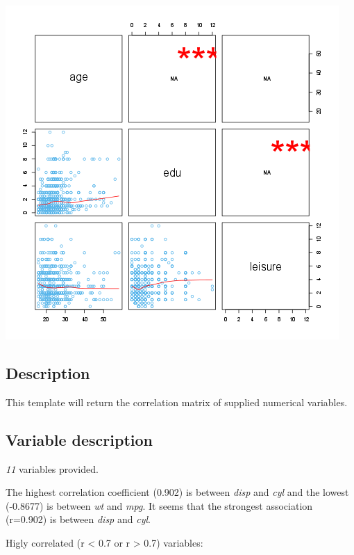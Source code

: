 \documentclass[]{article}
\makeatletter
\def\maxwidth{\ifdim\Gin@nat@width>\linewidth\linewidth
\else\Gin@nat@width\fi}
\let\Oldincludegraphics\includegraphics
\renewcommand{\includegraphics}[1]{\Oldincludegraphics[width=\maxwidth]{#1}}
\makeatother
\begin{document}
\href{0e4cca7017b21223d68df3b9e300c895-hires.png}{\includegraphics{0e4cca7017b21223d68df3b9e300c895.png}}

\subsection{Description}

This template will return the correlation matrix of supplied numerical
variables.

\subsection{Variable description}

\emph{11} variables provided.

The highest correlation coefficient (0.902) is between \emph{disp} and
\emph{cyl} and the lowest (-0.8677) is between \emph{wt} and \emph{mpg}.
It seems that the strongest association (r=0.902) is between \emph{disp}
and \emph{cyl}.

Higly correlated (r \textless{} 0.7 or r \textgreater{} 0.7) variables:
\end{document}
